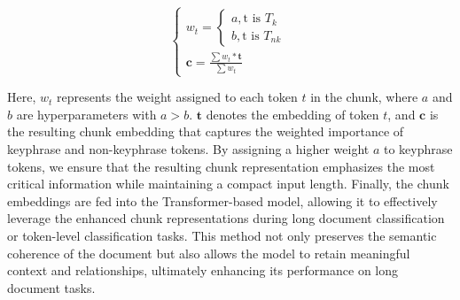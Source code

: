 \documentclass[11pt]{article}
\begin{document}
\begin{equation}
    \begin{cases}
        w_t = \begin{cases}
        a, \text{t is $T_k$}\\b, \text{t is $T_{nk}$}
        \end{cases} \\ 
       \boldsymbol{c} = \frac{\sum{w_t*\boldsymbol{t}}}{\sum{w_t}}
    \end{cases}
    \label{equ:chunkemb}
\end{equation}


Here, $w_t$ represents the weight assigned to each token $t$ in the chunk, where $a$ and $b$ are hyperparameters with $a > b.$
$\boldsymbol{t}$ denotes the embedding of token $t$, and $\boldsymbol{c}$ is the resulting chunk embedding that captures the weighted importance of keyphrase and non-keyphrase tokens. By assigning a higher weight $a$ to keyphrase tokens, we ensure that the resulting chunk representation emphasizes the most critical information while maintaining a compact input length.
Finally, the chunk embeddings are fed into the Transformer-based model, allowing it to effectively leverage the enhanced chunk representations during long document classification or token-level classification tasks. This method not only preserves the semantic coherence of the document but also allows the model to retain meaningful context and relationships, ultimately enhancing its performance on long document tasks.
\end{document}
